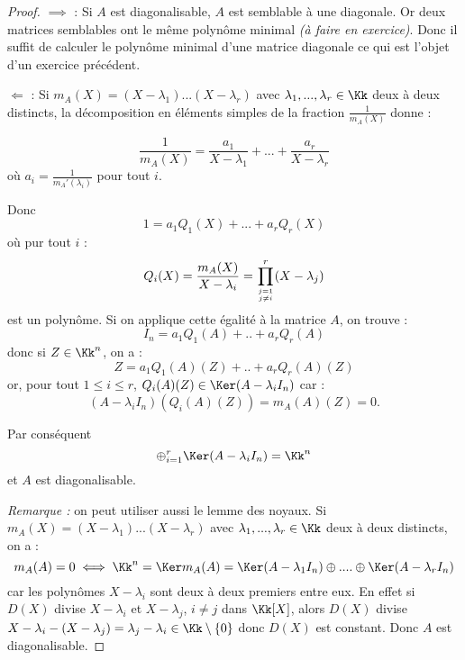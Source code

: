 \documentclass[class=report,crop=false]{standalone}
\newcommand{\exoo}{\emph{(à faire en exercice)}}
\begin{document}
\begin{proof}
{\boldmath $\implies$ :} Si $A$ est diagonalisable, $A$ est semblable à une diagonale. Or deux matrices semblables ont le même polynôme minimal \exoo. Donc il suffit de calculer le polynôme minimal d'une matrice diagonale ce qui est l'objet d'un exercice précédent.

{\boldmath $\Leftarrow$ : } Si $m_A(X) = (X-\lambda_1)...(X-\lambda_r)$ avec $\lambda_1,...,\lambda_r\in \Kk$ deux à deux distincts, la décomposition en éléments simples de la fraction $\frac{1}{m_A(X)}$ donne :

\[\frac{1}{m_A(X)} = \frac{a_1}{X-\lambda_1} +... +\frac{a_r}{X-\lambda_r}\]
où $a_i = \frac{1}{m_A'(\lambda_i)}$ pour tout $i$.

Donc \[1  = a_1 Q_1(X) + ... + a_r Q_r(X)\]
où pur tout $i$ : \[Q_i(X) = \frac{m_A(X)}{X-\lambda_i} = \prod_{j=1\atop j\neq i}^r(X-\lambda_j) \]
est un polynôme. Si on applique cette égalité à la matrice $A$, on trouve :
\[I_n = a_1Q_1(A) +..+a_rQ_r(A)\]
donc si $Z \in \Kk^n$, on a :
\[Z = a_1Q_1(A)(Z) +..+a_rQ_r(A)(Z)\]
or, pour tout $1 \le i \le r$, $Q_i(A)(Z) \in \Ker (A -\lambda_iI_n)$ car :
\[(A-\lambda_iI_n)(Q_i(A)(Z)) = m_A(A)(Z) = 0 .\]

Par conséquent \[\oplus_{i=1}^r \Ker (A-\lambda_iI_n) = \Kk^n\]
et $A$ est diagonalisable.

{\it Remarque : } on peut utiliser aussi le lemme des noyaux.   Si $m_A(X) = (X-\lambda_1)...(X-\lambda_r)$ avec $\lambda_1,...,\lambda_r\in \Kk$ deux à deux distincts, on a :
\[m_A(A) = 0 \iff \Kk^n=\Ker m_A(A) = \Ker (A-\lambda_1I_n) \oplus .... \oplus \Ker (A-\lambda_rI_n)\]
car les polynômes $X-\lambda_i$ sont deux à deux premiers entre eux. En effet si $D(X)$ divise $X-\lambda_i$ et $X-\lambda_j$, $i\neq j$ dans $\Kk[X]$, alors $D(X)$ divise $X-\lambda_i - (X-\lambda_j) = \lambda_j -\lambda_i\in \Kk \setminus \{0\}$ donc $D(X)$ est constant. Donc $A$ est diagonalisable.

\end{proof}
\end{document}
